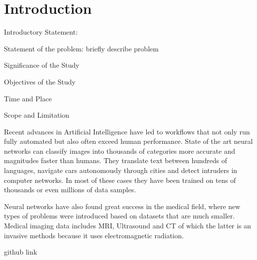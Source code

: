\section{Introduction}

Introductory Statement: 

Statement of the problem: briefly describe problem

Significance of the Study

Objectives of the Study

Time and Place

Scope and Limitation

Recent advances in Artificial Intelligence have led to workflows that not only run fully automated but also often exceed human performance. State of the art neural networks can classify images into thousands of categories more accurate and magnitudes faster than humans. They translate text between hundreds of languages, navigate cars autonomously through cities and detect intruders in computer networks. In most of these cases they have been trained on tens of thousands or even millions of data samples.

Neural networks have also found great success in the medical field, where new types of problems were introduced based on datasets that are much smaller. Medical imaging data includes MRI, Ultrasound and CT of which the latter is an invasive methods because it uses electromagnetic radiation.

github link

\newpage
